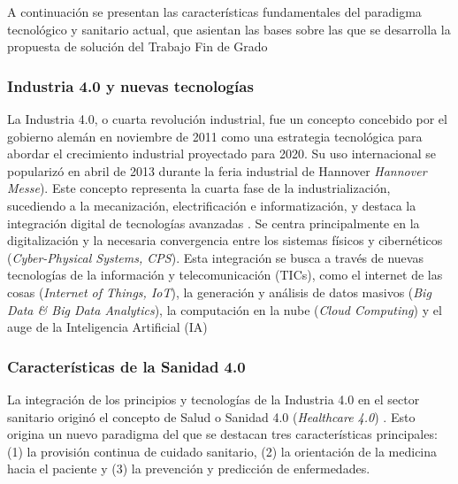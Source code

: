 A continuación se presentan las características fundamentales del paradigma tecnológico y sanitario actual, que asientan las bases sobre las que se desarrolla la propuesta de solución del Trabajo Fin de Grado


\subsubsection{Industria 4.0 y nuevas tecnologías}

La Industria 4.0, o cuarta revolución industrial, fue un concepto concebido por el gobierno alemán en noviembre de 2011 como una estrategia tecnológica para abordar el crecimiento industrial proyectado para 2020. Su uso internacional se popularizó en abril de 2013 durante la feria industrial de Hannover \textit{Hannover Messe}). Este concepto representa la cuarta fase de la industrialización, sucediendo a la mecanización, electrificación e informatización, y destaca la integración digital de tecnologías avanzadas \cite{lasi2014industry}.
Se centra principalmente en la digitalización y la necesaria convergencia entre los sistemas físicos y cibernéticos (\textit{Cyber-Physical Systems, CPS}). Esta integración se busca a través de nuevas tecnologías de la información y telecomunicación (TICs), como el internet de las cosas (\textit{Internet of Things, IoT}), la generación y análisis de datos masivos (\textit{Big Data \& Big Data Analytics}), la computación en la nube (\textit{Cloud Computing}) y el auge de la Inteligencia Artificial (IA) \cite{lasi2014industry, chen2020times, tortorella2020healthcare}

\subsubsection{Características de la Sanidad 4.0}

La integración de los principios y tecnologías de la Industria 4.0 en el sector sanitario originó el concepto de Salud o Sanidad 4.0 (\textit{Healthcare 4.0}) \cite{tortorella2020healthcare, tortorella2021impacts}.  %
Esto origina un nuevo paradigma del que se destacan tres  características principales: (1) la provisión continua de cuidado sanitario, (2) la orientación de la medicina hacia el paciente y (3) la prevención y predicción de enfermedades.


